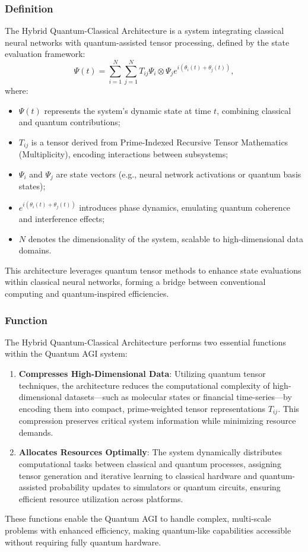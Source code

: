 \documentclass[12pt]{article}
\begin{document}
\subsubsection{Definition}
The Hybrid Quantum-Classical Architecture is a system integrating classical neural networks with quantum-assisted tensor processing, defined by the state evaluation framework:
\begin{equation}
\Psi(t) = \sum_{i=1}^N \sum_{j=1}^N T_{ij} \Psi_i \otimes \Psi_j e^{i(\theta_i(t) + \theta_j(t))},
\end{equation}
where:
\begin{itemize}
    \item \( \Psi(t) \) represents the system’s dynamic state at time \( t \), combining classical and quantum contributions;
    \item \( T_{ij} \) is a tensor derived from Prime-Indexed Recursive Tensor Mathematics (Multiplicity), encoding interactions between subsystems;
    \item \( \Psi_i \) and \( \Psi_j \) are state vectors (e.g., neural network activations or quantum basis states);
    \item \( e^{i(\theta_i(t) + \theta_j(t))} \) introduces phase dynamics, emulating quantum coherence and interference effects;
    \item \( N \) denotes the dimensionality of the system, scalable to high-dimensional data domains.
\end{itemize}
This architecture leverages quantum tensor methods to enhance state evaluations within classical neural networks, forming a bridge between conventional computing and quantum-inspired efficiencies.

\subsubsection{Function}
The Hybrid Quantum-Classical Architecture performs two essential functions within the Quantum AGI system:
\begin{enumerate}
    \item \textbf{Compresses High-Dimensional Data}: Utilizing quantum tensor techniques, the architecture reduces the computational complexity of high-dimensional datasets—such as molecular states or financial time-series—by encoding them into compact, prime-weighted tensor representations \( T_{ij} \). This compression preserves critical system information while minimizing resource demands.
    \item \textbf{Allocates Resources Optimally}: The system dynamically distributes computational tasks between classical and quantum processes, assigning tensor generation and iterative learning to classical hardware and quantum-assisted probability updates to simulators or quantum circuits, ensuring efficient resource utilization across platforms.
\end{enumerate}
These functions enable the Quantum AGI to handle complex, multi-scale problems with enhanced efficiency, making quantum-like capabilities accessible without requiring fully quantum hardware.
\end{document}

